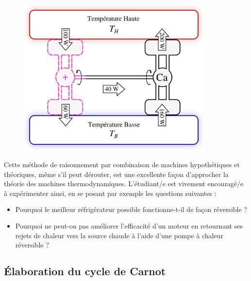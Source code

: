 		\begin{figure}
			\begin{center}
				\includegraphics[height=8cm]{images/carnot_moteur_plusplus.png}
			\end{center}
			\label{fig_plus_que_machine_de_carnot}
		\end{figure}

		Cette méthode de raisonnement par combinaison de machines hypothétiques et théoriques, même s’il peut dérouter, est une excellente façon d’approcher la théorie des machines thermodynamiques. L’étudiant/e est vivement encouragé/e à expérimenter ainsi, en se posant par exemple les questions suivantes :

		\begin{itemize}
			\item Pourquoi le meilleur réfrigérateur possible fonctionne-t-il de façon réversible ?
			\item Pourquoi ne peut-on pas améliorer l’efficacité d’un moteur en retournant ses rejets de chaleur vers la source chaude à l’aide d’une pompe à chaleur réversible ?
		\end{itemize}


	\subsection{Élaboration du cycle de Carnot}
	\label{ch_elaboration_cycle_carnot}

